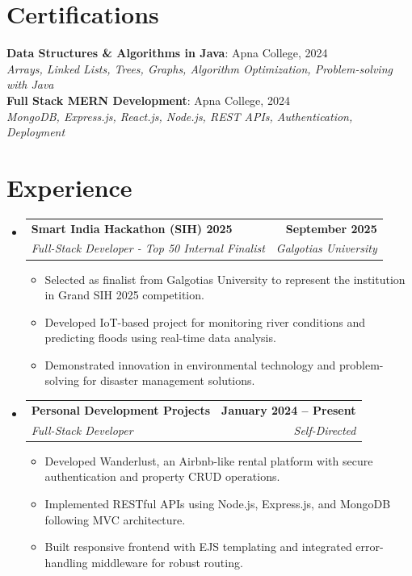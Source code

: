 \documentclass[letterpaper,11pt]{article}
\makeatletter
\newcommand{\resumeItem}[1]{
  \item\small{
    {#1 \vspace{-2pt}}
  }
}
\newcommand{\resumeSubheading}[4]{
  \vspace{-2pt}\item
    \begin{tabular*}{1.0\textwidth}[t]{l@{\extracolsep{\fill}}r}
      \textbf{#1} & \textbf{\small #2} \\
      \textit{\small#3} & \textit{\small #4} \\
    \end{tabular*}\vspace{-7pt}
}
\newcommand{\resumeSubHeadingListStart}{\begin{itemize}[leftmargin=0.0in, label={}]}
\newcommand{\resumeSubHeadingListEnd}{\end{itemize}}
\newcommand{\resumeItemListStart}{\begin{itemize}}
\newcommand{\resumeItemListEnd}{\end{itemize}\vspace{-5pt}}
\makeatother
\begin{document}
\section{Certifications}
 \begin{itemize}[leftmargin=0.15in, label={}]
    \small{\item{
     \textbf{Data Structures \& Algorithms in Java}{: Apna College, 2024} \\
     \textit{Arrays, Linked Lists, Trees, Graphs, Algorithm Optimization, Problem-solving with Java} \\
     \textbf{Full Stack MERN Development}{: Apna College, 2024} \\
     \textit{MongoDB, Express.js, React.js, Node.js, REST APIs, Authentication, Deployment}
    }}
 \end{itemize}
 \vspace{-16pt}

\section{Experience}
  \resumeSubHeadingListStart
    \resumeSubheading
      {Smart India Hackathon (SIH) 2025}{September 2025}
      {Full-Stack Developer - Top 50 Internal Finalist}{Galgotias University}
      \resumeItemListStart
        \resumeItem{Selected as finalist from Galgotias University to represent the institution in Grand SIH 2025 competition.}
        \resumeItem{Developed IoT-based project for monitoring river conditions and predicting floods using real-time data analysis.}
        \resumeItem{Demonstrated innovation in environmental technology and problem-solving for disaster management solutions.}
      \resumeItemListEnd

    \resumeSubheading
      {Personal Development Projects}{January 2024 -- Present}
      {Full-Stack Developer}{Self-Directed}
      \resumeItemListStart
        \resumeItem{Developed Wanderlust, an Airbnb-like rental platform with secure authentication and property CRUD operations.}
        \resumeItem{Implemented RESTful APIs using Node.js, Express.js, and MongoDB following MVC architecture.}
        \resumeItem{Built responsive frontend with EJS templating and integrated error-handling middleware for robust routing.}
      \resumeItemListEnd
  \resumeSubHeadingListEnd
\vspace{-16pt}

\end{document}

